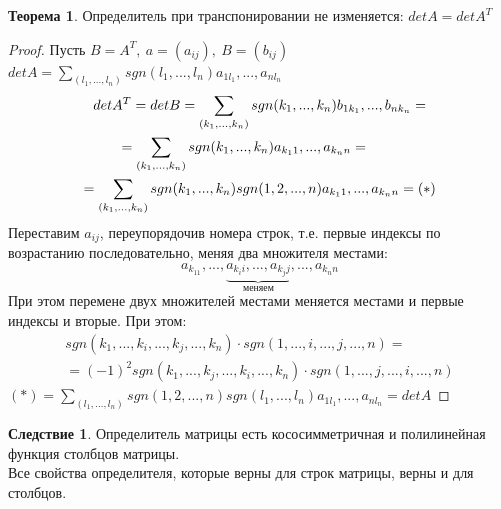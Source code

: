 \documentclass[a4paper, 12pt]{article}
\newcommand\tab[1][.5cm]{\hspace*{#1}}
\newcounter{thcount}
\theoremstyle{definition}
\newtheorem*{consequense}{Следствие}
\newtheorem{theoremnum}[thcount]{Теорема}
\begin{document}
  \begin{theoremnum}
    Определитель при транспонировании не изменяется: $detA = detA^T$
  \end{theoremnum} 

  \begin{proof}
    Пусть $B = A^T, \ a=(a_{ij}), \ B=(b_{ij})$ \\
    $detA = \sum \limits_{(l_1,...,l_n)}sgn(l_1,...,l_n)a_{1l_1},...,a_{nl_n}$
    \begin{multline*}
      detA^T = detB = \sum \limits_{(k_1,...,k_n)}sgn(k_1,...,k_n)b_{1k_1},...,b_{nk_n} = \\
      = \sum \limits_{(k_1,...,k_n)}sgn(k_1,...,k_n)a_{k_11},...,a_{k_nn} = \tab[0.8cm]\\ 
      = \sum \limits_{(k_1,...,k_n)}sgn(k_1,...,k_n) sgn(1,2,...,n)a_{k_11},...,a_{k_nn} = (*)
    \end{multline*} 
    Переставим $a_{ij}$, переупорядочив номера строк, т.е. первые индексы по возрастанию последовательно, меняя два множителя местами: $$a_{k_11},...,\underbrace{a_{k_ii},...,a_{k_jj}}_{\text{меняем}},...,a_{k_nn}$$ 
    При этом перемене двух множителей местами меняется местами и первые индексы и вторые. При этом: 
    \begin{multline*}
      sgn(k_1,...,k_i,...,k_j,...,k_n) \cdot sgn(1,...,i,...,j,...,n) = \\ = (-1)^2 sgn(k_1,...,k_j,...,k_i,...,k_n)\cdot sgn(1,...,j,...,i,...,n)
    \end{multline*}
    $(*) = \sum \limits_{(l_1,...,l_n)} sgn(1,2,...,n) sgn(l_1,...,l_n) a_{1l_1},...,a_{nl_n} = detA$
  \end{proof} 
  \begin{consequense}
    Определитель матрицы есть кососимметричная и полилинейная функция столбцов матрицы. \\
    Все свойства определителя, которые верны для строк матрицы, верны и для столбцов.
  \end{consequense} 
\end{document}
